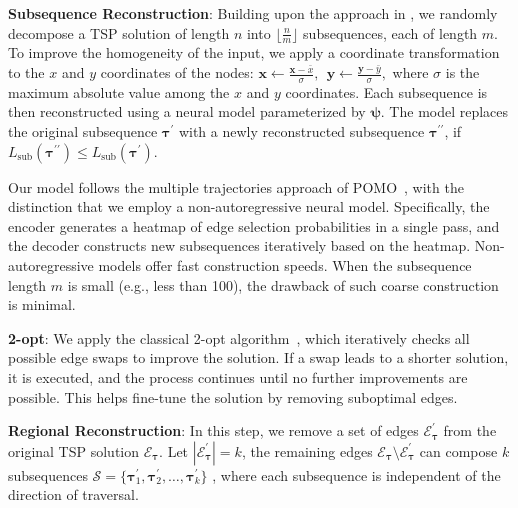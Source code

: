 \textbf{Subsequence Reconstruction}: Building upon the approach in \citet{ye2024glop}, we randomly decompose a TSP solution of length $n$ into $\lfloor \frac{n}{m} \rfloor$ subsequences, each of length $m$. 
To improve the homogeneity of the input, we apply a coordinate transformation to the $x$ and $y$ coordinates of the nodes: 
$\boldsymbol{x} \leftarrow \frac{\boldsymbol{x}-\bar{x}}{\sigma},  ~~\boldsymbol{y}\leftarrow\frac{\boldsymbol{y}-\bar{y}}{\sigma}, $
where $\sigma$ is the maximum absolute value among the $x$ and $y$ coordinates. 
Each subsequence is then reconstructed using a neural model parameterized by $\boldsymbol{\psi}$. 
The model replaces the original subsequence $\boldsymbol{\tau}^{\prime}$ with a newly reconstructed subsequence \textbf{$\boldsymbol{\tau}^{\prime\prime}$},   if $L_{\text{sub}}(\boldsymbol{\tau}^{\prime\prime}) \leq L_{\text{sub}}(\boldsymbol{\tau}^{\prime})$.

Our model follows the multiple trajectories approach of POMO~\cite{kwon2020pomo}, with the distinction that we employ a non-autoregressive neural model. Specifically, the encoder generates a heatmap 
of edge selection probabilities in a single pass, and the decoder constructs new subsequences iteratively based on 
the heatmap. 
Non-autoregressive models offer fast construction speeds. When the subsequence length $m$ is small (e.g., less than 100), the drawback of such coarse construction~\cite{ye2024glop} is minimal. %

\textbf{2-opt}: We apply the classical 2-opt algorithm~\cite{lin1973effective}, which iteratively checks all possible  edge swaps to improve the solution. 
If a swap leads to a shorter solution, it is executed, and the process continues  until no further improvements are possible. This helps fine-tune the solution by removing suboptimal edges.

\textbf{Regional Reconstruction}: 
In this step, we remove a set of edges $\mathcal{E}_{\boldsymbol{\tau}}^{\prime}$ from the original TSP solution $\mathcal{E}_{\boldsymbol{\tau}}$.  Let $|\mathcal{E}_{\boldsymbol{\tau}}^{\prime}|=k$, the remaining edges $\mathcal{E}_{\boldsymbol{\tau}} \setminus \mathcal{E}_{\boldsymbol{\tau}}^{\prime}$ can compose $k$ subsequences 
$\mathcal{S}=\{ \boldsymbol{\tau}_{1}^{\prime}, \boldsymbol{\tau}_{2}^{\prime}, \dots, \boldsymbol{\tau}_{k}^{\prime} \}$%
, where each subsequence is independent of the direction of traversal.

